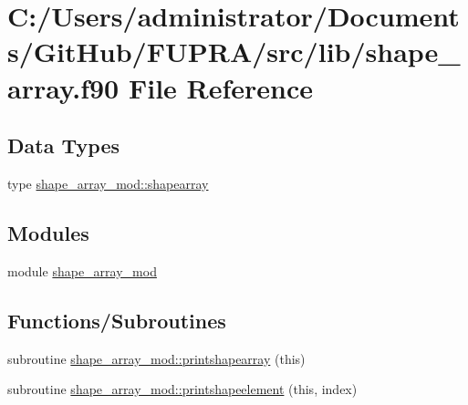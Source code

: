 \hypertarget{shape__array_8f90}{}\section{C\+:/\+Users/administrator/\+Documents/\+Git\+Hub/\+F\+U\+P\+R\+A/src/lib/shape\+\_\+array.f90 File Reference}
\label{shape__array_8f90}
\subsection*{Data Types}
\begin{DoxyCompactItemize}
\item 
type \mbox{\hyperlink{structshape__array__mod_1_1shapearray}{shape\+\_\+array\+\_\+mod\+::shapearray}}
\end{DoxyCompactItemize}
\subsection*{Modules}
\begin{DoxyCompactItemize}
\item 
module \mbox{\hyperlink{namespaceshape__array__mod}{shape\+\_\+array\+\_\+mod}}
\end{DoxyCompactItemize}
\subsection*{Functions/\+Subroutines}
\begin{DoxyCompactItemize}
\item 
subroutine \mbox{\hyperlink{namespaceshape__array__mod_a7b3e08e575b74d321d61ffaea85c2895}{shape\+\_\+array\+\_\+mod\+::printshapearray}} (this)
\item 
subroutine \mbox{\hyperlink{namespaceshape__array__mod_a21045b79e1718e47bd933ce6181ee7fd}{shape\+\_\+array\+\_\+mod\+::printshapeelement}} (this, index)
\end{DoxyCompactItemize}
